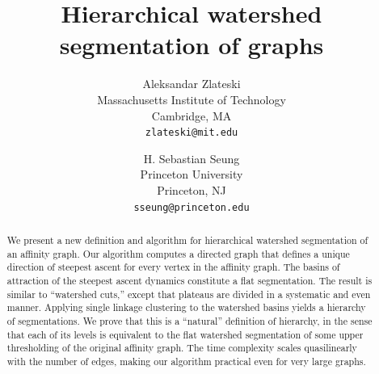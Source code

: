 \documentclass{article}
\begin{document}

\title{Hierarchical watershed segmentation of graphs}

\author{
Aleksandar Zlateski\\ Massachusetts Institute of Technology\\ Cambridge, MA\\
{\tt\small zlateski@mit.edu}
\and
H. Sebastian Seung\\ Princeton University\\ Princeton, NJ\\
{\tt\small sseung@princeton.edu}
}



\maketitle



\begin{abstract}
We present a new definition and algorithm for hierarchical watershed
segmentation of an affinity graph.  Our algorithm computes a directed
graph that defines a unique direction of steepest ascent for every
vertex in the affinity graph.
The basins of attraction of the steepest ascent dynamics constitute a
flat segmentation.  The result is similar to ``watershed cuts,''
except that plateaus are divided in a systematic and even manner.
Applying single linkage clustering to the watershed basins yields a
hierarchy of segmentations.  We prove that this is a ``natural''
definition of hierarchy, in the sense that each of its levels is
equivalent to the flat watershed segmentation of some upper
thresholding of the original affinity graph. The time complexity
scales quasilinearly with the number of edges, making our algorithm
practical even for very large graphs.

\end{abstract}
\end{document}
